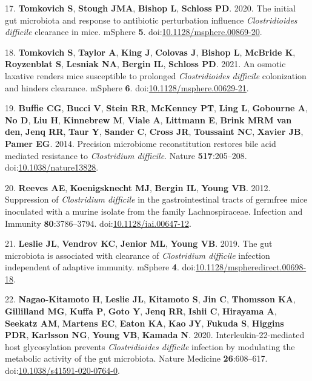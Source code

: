 \documentclass[
  12pt,
]{article}
\newenvironment{cslreferences}%
  {}%
  {\par}
\begin{document}
\begin{cslreferences}
\leavevmode\hypertarget{ref-Tomkovich2020}{}%
17. \textbf{Tomkovich S}, \textbf{Stough JMA}, \textbf{Bishop L},
\textbf{Schloss PD}. 2020. The initial gut microbiota and response to
antibiotic perturbation influence \emph{Clostridioides difficile}
clearance in mice. mSphere \textbf{5}.
doi:\href{https://doi.org/10.1128/msphere.00869-20}{10.1128/msphere.00869-20}.

\leavevmode\hypertarget{ref-Tomkovich2021}{}%
18. \textbf{Tomkovich S}, \textbf{Taylor A}, \textbf{King J},
\textbf{Colovas J}, \textbf{Bishop L}, \textbf{McBride K},
\textbf{Royzenblat S}, \textbf{Lesniak NA}, \textbf{Bergin IL},
\textbf{Schloss PD}. 2021. An osmotic laxative renders mice susceptible
to prolonged \emph{Clostridioides difficile} colonization and hinders
clearance. mSphere \textbf{6}.
doi:\href{https://doi.org/10.1128/msphere.00629-21}{10.1128/msphere.00629-21}.

\leavevmode\hypertarget{ref-Buffie2015}{}%
19. \textbf{Buffie CG}, \textbf{Bucci V}, \textbf{Stein RR},
\textbf{McKenney PT}, \textbf{Ling L}, \textbf{Gobourne A}, \textbf{No
D}, \textbf{Liu H}, \textbf{Kinnebrew M}, \textbf{Viale A},
\textbf{Littmann E}, \textbf{Brink MRM van den}, \textbf{Jenq RR},
\textbf{Taur Y}, \textbf{Sander C}, \textbf{Cross JR}, \textbf{Toussaint
NC}, \textbf{Xavier JB}, \textbf{Pamer EG}. 2014. Precision microbiome
reconstitution restores bile acid mediated resistance to
\emph{Clostridium difficile}. Nature \textbf{517}:205--208.
doi:\href{https://doi.org/10.1038/nature13828}{10.1038/nature13828}.

\leavevmode\hypertarget{ref-Reeves2012}{}%
20. \textbf{Reeves AE}, \textbf{Koenigsknecht MJ}, \textbf{Bergin IL},
\textbf{Young VB}. 2012. Suppression of \emph{Clostridium difficile} in
the gastrointestinal tracts of germfree mice inoculated with a murine
isolate from the family Lachnospiraceae. Infection and Immunity
\textbf{80}:3786--3794.
doi:\href{https://doi.org/10.1128/iai.00647-12}{10.1128/iai.00647-12}.

\leavevmode\hypertarget{ref-Leslie2019}{}%
21. \textbf{Leslie JL}, \textbf{Vendrov KC}, \textbf{Jenior ML},
\textbf{Young VB}. 2019. The gut microbiota is associated with clearance
of \emph{Clostridium difficile} infection independent of adaptive
immunity. mSphere \textbf{4}.
doi:\href{https://doi.org/10.1128/mspheredirect.00698-18}{10.1128/mspheredirect.00698-18}.

\leavevmode\hypertarget{ref-NagaoKitamoto2020}{}%
22. \textbf{Nagao-Kitamoto H}, \textbf{Leslie JL}, \textbf{Kitamoto S},
\textbf{Jin C}, \textbf{Thomsson KA}, \textbf{Gillilland MG},
\textbf{Kuffa P}, \textbf{Goto Y}, \textbf{Jenq RR}, \textbf{Ishii C},
\textbf{Hirayama A}, \textbf{Seekatz AM}, \textbf{Martens EC},
\textbf{Eaton KA}, \textbf{Kao JY}, \textbf{Fukuda S}, \textbf{Higgins
PDR}, \textbf{Karlsson NG}, \textbf{Young VB}, \textbf{Kamada N}. 2020.
Interleukin-22-mediated host glycosylation prevents \emph{Clostridioides
difficile} infection by modulating the metabolic activity of the gut
microbiota. Nature Medicine \textbf{26}:608--617.
doi:\href{https://doi.org/10.1038/s41591-020-0764-0}{10.1038/s41591-020-0764-0}.


\end{cslreferences}
\end{document}
